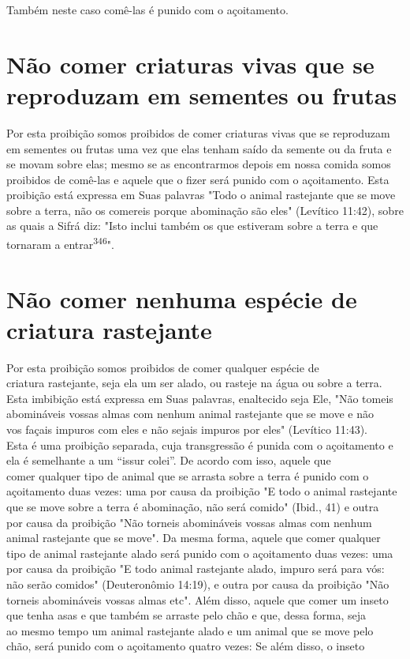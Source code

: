 Também neste caso comê-las é punido com o açoitamento.

\section{Não comer criaturas vivas que se reproduzam em sementes ou frutas}

Por esta proibição somos proibidos de comer criaturas vivas que se
reproduzam em sementes ou frutas uma vez que elas tenham saído da
semente ou da fruta e se movam sobre elas; mesmo se as encontrarmos
depois em nossa comida somos proibidos de comê-las e aquele que o fizer
será punido com o açoitamento. Esta proibição está expressa em Suas
palavras "Todo o animal ras­tejante que se move sobre a terra, não os
comereis porque abominação são eles" (Levítico 11:42), sobre as quais a
Sifrá diz: "Isto inclui também os que estive­ram sobre a terra e que
tornaram a entrar\textsuperscript{346}".

\section{Não comer nenhuma espécie de criatura rastejante}

Por esta proibição somos proibidos de comer qualquer espécie de\\
criatura rastejante, seja ela um ser alado, ou rasteje na água ou sobre
a terra.\\
Esta imbibição está expressa em Suas palavras, enaltecido seja Ele, "Não
tomeis\\
abomináveis vossas almas com nenhum animal rastejante que se move e
não\\
vos façais impuros com eles e não sejais impuros por eles" (Levítico
11:43).\\
Esta é uma proibição separada, cuja transgressão é punida com o açoitamento
e ela é semelhante a um ``issur colei''. De acordo com isso,
aquele que\\
comer qualquer tipo de animal que se arrasta sobre a terra é punido com
o açoitamento
duas vezes: uma por causa da proibição "E todo o animal
rastejante\\
que se move sobre a terra é abominação, não será comido" (Ibid., 41) e
outra\\
por causa da proibição "Não torneis abomináveis vossas almas com
nenhum\\
animal rastejante que se move". Da mesma forma, aquele que comer
qualquer\\
tipo de animal rastejante alado será punido com o açoitamento duas
vezes: uma\\
por causa da proibição "E todo animal rastejante alado, impuro será para
vós:\\
não serão comidos" (Deuteronômio 14:19), e outra por causa da proibição
"Não\\
torneis abomináveis vossas almas etc". Além disso, aquele que comer um
inseto
que tenha asas e que também se arraste pelo chão e que, dessa forma,
seja\\
ao mesmo tempo um animal rastejante alado e um animal que se move pelo\\
chão, será punido com o açoitamento quatro vezes: Se além disso, o
inseto


